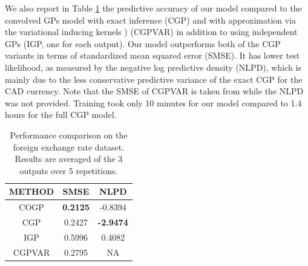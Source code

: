 We also report in Table \ref{tab:fx} the predictive accuracy of our model compared to the convolved GPs model with exact inference \citet{alvarez-lawrence-nips-08} (CGP) and with approximation via the variational inducing kernels \citet{alvarez2010efficient}) (CGPVAR) in addition to using independent GPs (IGP, one for each output).
Our model outperforms both of the CGP variants in terms of standardized mean squared error (SMSE).
It has lower test likelihood, as measured by the negative log predictive density (NLPD), which is mainly due to the less conservative predictive variance of the exact CGP for the CAD currency.
Note that the SMSE of CGPVAR is taken from \citet{alvarez2010efficient} while the NLPD was not provided.
Training took only 10 minutes for our model compared to 1.4 hours for the full CGP model.

\setlength{\tabcolsep}{4pt}
\begin{table}[t]
\caption{Performance comparison on the foreign exchange rate dataset. Results are averaged of the 3 outputs over 5 repetitions.}
\label{tab:fx}
\begin{center}
\begin{tabular}{ccc}
\toprule
\textbf{METHOD} & \textbf{SMSE} & \textbf{NLPD} \\ \hline
COGP  & \textbf{0.2125} & -0.8394 \\
CGP & 0.2427 & \textbf{-2.9474} \\
IGP & 0.5996 & 0.4082 \\
CGPVAR & 0.2795 & NA \\
\bottomrule
\end{tabular}
\end{center}
\end{table}


